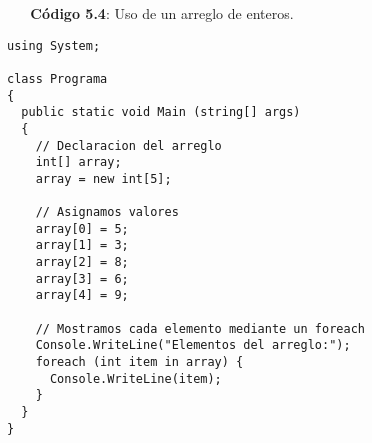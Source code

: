 ~\newline
~\newline
\textbf{C\'odigo 5.4}: Uso de un arreglo de enteros.
\begin{lstlisting}[frame=single]
using System;

class Programa
{
  public static void Main (string[] args)
  {
  	// Declaracion del arreglo
    int[] array;			
    array = new int[5];
			
	// Asignamos valores
    array[0] = 5;
    array[1] = 3;
    array[2] = 8;
    array[3] = 6;
    array[4] = 9;
			
	// Mostramos cada elemento mediante un foreach
    Console.WriteLine("Elementos del arreglo:");
    foreach (int item in array) {
      Console.WriteLine(item);
    }
  }
}

\end{lstlisting}
\clearpage

